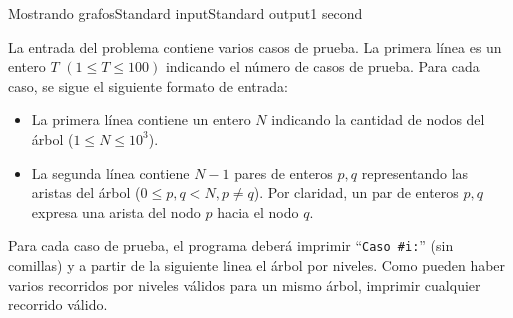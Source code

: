 \begin{problem}{Mostrando grafos}{Standard input}{Standard output}{1 second}{}
\InputFile

La entrada del problema contiene varios casos de prueba. La primera línea es un entero $T$ $(1 \leq T \leq 100)$ indicando el número de casos de prueba. Para cada caso, se sigue el siguiente formato de entrada:

\begin{itemize}
\item La primera línea contiene un entero $N$ indicando la cantidad de nodos del árbol ($1 \leq N \leq 10^3$).

\item La segunda línea contiene $N - 1$ pares de enteros $p, q$ representando las aristas del árbol ($0 \leq p, q < N, p\neq q$). Por claridad, un par de enteros $p, q$ expresa una arista del nodo $p$ hacia el nodo $q$.

\end{itemize}

\OutputFile
Para cada caso de prueba, el programa deber\'a imprimir ``\texttt{Caso \#i:}'' (sin comillas) y a partir de la siguiente linea el árbol por niveles. Como pueden haber varios recorridos por niveles válidos para un mismo árbol, imprimir cualquier recorrido válido.

\Example

\begin{example}
\end{example}

\end{problem}
